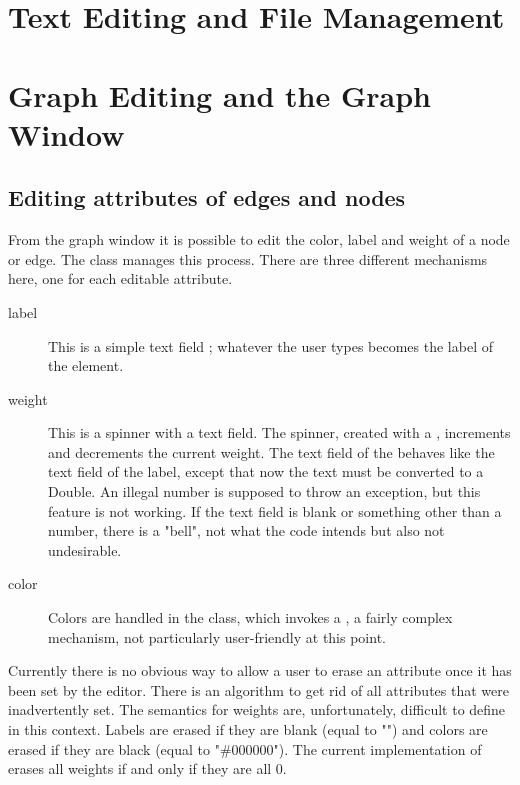 \section{Text Editing and File Management} \label{sec:editing}

\section{Graph Editing and the Graph Window} \label{sec:graph_window}

\subsection{Editing attributes of edges and nodes}

From the graph window it is possible to edit the color, label and weight of a
node or edge.
The  class manages this process. There are three
different mechanisms here, one for each editable attribute.
\begin{description}
\item[label] This is a simple text field ; whatever the user
  types becomes the label of the element.
\item[weight] This is a spinner with a text field. The spinner, created with
  a , increments and decrements the current
  weight. The text field of the  behaves like the text field of
  the label, except that now the text must be converted to a Double.
  An illegal number is supposed to throw an exception, but this feature is
  not working. If the text field is blank or something other than a number,
  there is a "bell", not what the code intends but also not undesirable.
\item[color] Colors are handled in the  class, which invokes
  a , a fairly complex mechanism, not particularly
  user-friendly at this point.
\end{description}
Currently there is no obvious way to allow a user to erase an attribute once
it has been set by the editor. There is an algorithm 
to get rid of all attributes that were inadvertently set. The semantics for
weights are, unfortunately, difficult to define in this context. Labels are
erased if they are blank (equal to "") and colors are erased if they are black
(equal to "\#000000"). The current implementation of 
erases all weights if and only if they are all 0.

